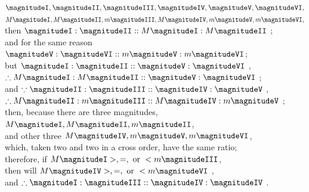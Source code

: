 \documentclass[booklanguage=english]{byrnebook}
\begin{document}
\begin{center}
$\magnitudeI, \magnitudeII, \magnitudeIII, \magnitudeIV, \magnitudeV, \magnitudeVI,$\\
$M \magnitudeI, M \magnitudeII, m \magnitudeIII, M \magnitudeIV, m \magnitudeV, m \magnitudeVI,$\\
then $\magnitudeI : \magnitudeII :: M \magnitudeI : M \magnitudeII$ ;\\
and for the same reason\\
$\magnitudeV : \magnitudeVI :: m \magnitudeV : m \magnitudeVI$;\\
but $\magnitudeI : \magnitudeII :: \magnitudeV : \magnitudeVI$ \byref{\hypref},\\
$\therefore M \magnitudeI : M \magnitudeII :: \magnitudeV : \magnitudeVI$ ;\\
and $\because \magnitudeII : \magnitudeIII :: \magnitudeIV : \magnitudeV$ \byref{\hypref},\\ %
$\therefore M \magnitudeII : m \magnitudeIII :: M \magnitudeIV : m \magnitudeV$ ;\\
then, because there are three magnitudes,\\
$M \magnitudeI, M \magnitudeII, m \magnitudeII$,\\
and other three $M \magnitudeIV, m \magnitudeV, m \magnitudeVI$,\\
which, taken two and two in a cross order, have the same ratio;\\
therefore, if $M \magnitudeI >, =, \mbox{ or } < m \magnitudeIII$,\\
then will $M \magnitudeIV >, =, \mbox{ or } < m \magnitudeVI$ ,\\
and $\therefore \magnitudeI : \magnitudeIII :: \magnitudeIV : \magnitudeIV$ .


\end{center}
\end{document}
